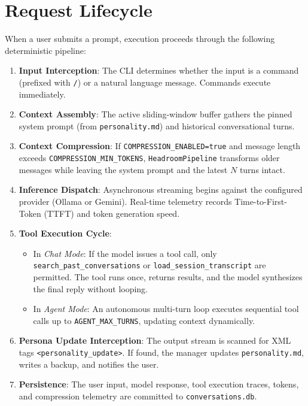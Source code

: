 \section{Request Lifecycle}
When a user submits a prompt, execution proceeds through the following deterministic pipeline:
\begin{enumerate}
    \item \textbf{Input Interception}: The CLI determines whether the input is a command (prefixed with \texttt{/}) or a natural language message. Commands execute immediately.
    \item \textbf{Context Assembly}: The active sliding-window buffer gathers the pinned system prompt (from \texttt{personality.md}) and historical conversational turns.
    \item \textbf{Context Compression}: If \texttt{COMPRESSION\_ENABLED=true} and message length exceeds \texttt{COMPRESSION\_MIN\_TOKENS}, \texttt{HeadroomPipeline} transforms older messages while leaving the system prompt and the latest $N$ turns intact.
    \item \textbf{Inference Dispatch}: Asynchronous streaming begins against the configured provider (Ollama or Gemini). Real-time telemetry records Time-to-First-Token (TTFT) and token generation speed.
    \item \textbf{Tool Execution Cycle}:
    \begin{itemize}
        \item In \emph{Chat Mode}: If the model issues a tool call, only \texttt{search\_past\_conversations} or \texttt{load\_session\_transcript} are permitted. The tool runs once, returns results, and the model synthesizes the final reply without looping.
        \item In \emph{Agent Mode}: An autonomous multi-turn loop executes sequential tool calls up to \texttt{AGENT\_MAX\_TURNS}, updating context dynamically.
    \end{itemize}
    \item \textbf{Persona Update Interception}: The output stream is scanned for XML tags \texttt{<personality\_update>}. If found, the manager updates \texttt{personality.md}, writes a backup, and notifies the user.
    \item \textbf{Persistence}: The user input, model response, tool execution traces, tokens, and compression telemetry are committed to \texttt{conversations.db}.
\end{enumerate}

